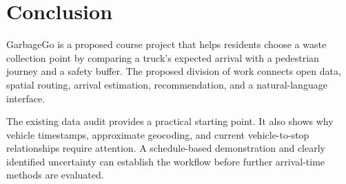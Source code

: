 \section{Conclusion}\label{sec:conclusion}
GarbageGo is a proposed course project that helps residents choose a waste collection point by comparing a truck's expected arrival with a pedestrian journey and a safety buffer. The proposed division of work connects open data, spatial routing, arrival estimation, recommendation, and a natural-language interface.

The existing data audit provides a practical starting point. It also shows why vehicle timestamps, approximate geocoding, and current vehicle-to-stop relationships require attention. A schedule-based demonstration and clearly identified uncertainty can establish the workflow before further arrival-time methods are evaluated.
